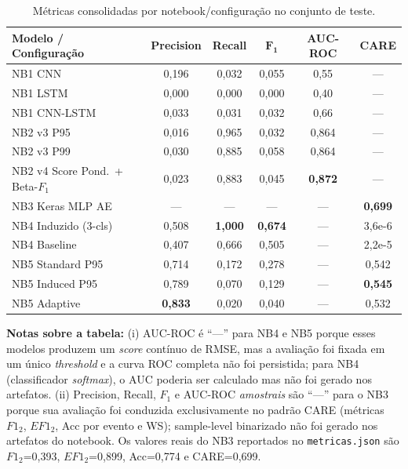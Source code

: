 \documentclass[12pt]{article}
\begin{document}
\begin{table}[!ht]
\centering
\small
\begin{tabular}{l|c|c|c|c|c}
\hline
\textbf{Modelo / Configuração} & \textbf{Precision} & \textbf{Recall} & $\boldsymbol{F_1}$ & \textbf{AUC-ROC} & \textbf{CARE} \\
\hline
NB1 CNN                          & 0,196 & 0,032 & 0,055 & 0,55  & --- \\
NB1 LSTM                         & 0,000 & 0,000 & 0,000 & 0,40  & --- \\
NB1 CNN-LSTM                     & 0,033 & 0,031 & 0,032 & 0,66  & --- \\
NB2 v3 P95                       & 0,016 & 0,965 & 0,032 & 0,864 & --- \\
NB2 v3 P99                       & 0,030 & 0,885 & 0,058 & 0,864 & --- \\
NB2 v4 Score Pond.\ + Beta-$F_1$ & 0,023 & 0,883 & 0,045 & \textbf{0,872} & --- \\
NB3 Keras MLP AE                 & ---   & ---   & ---   & ---   & \textbf{0,699} \\
NB4 Induzido (3-cls)             & 0,508 & \textbf{1,000} & \textbf{0,674} & --- & 3,6e-6 \\
NB4 Baseline                     & 0,407 & 0,666 & 0,505 & --- & 2,2e-5 \\
NB5 Standard P95                 & 0,714 & 0,172 & 0,278 & --- & 0,542 \\
NB5 Induced P95                  & 0,789 & 0,070 & 0,129 & --- & \textbf{0,545} \\
NB5 Adaptive                     & \textbf{0,833} & 0,020 & 0,040 & --- & 0,532 \\
\hline
\end{tabular}
\caption{Métricas consolidadas por notebook/configuração no conjunto de teste.}
\label{tab:metricas_consolidadas}
\end{table}

\noindent\textbf{Notas sobre a tabela:} (i) AUC-ROC é ``---'' para NB4 e NB5 porque esses modelos produzem um \textit{score} contínuo de RMSE, mas a avaliação foi fixada em um único \textit{threshold} e a curva ROC completa não foi persistida; para NB4 (classificador \textit{softmax}), o AUC poderia ser calculado mas não foi gerado nos artefatos. (ii) Precision, Recall, $F_1$ e AUC-ROC \emph{amostrais} são ``---'' para o NB3 porque sua avaliação foi conduzida exclusivamente no padrão CARE (métricas $F1_2$, $EF1_2$, Acc por evento e WS); sample-level binarizado não foi gerado nos artefatos do notebook. Os valores reais do NB3 reportados no \texttt{metricas.json} são $F1_2$=0,393, $EF1_2$=0,899, Acc=0,774 e CARE=0,699.
\end{document}
